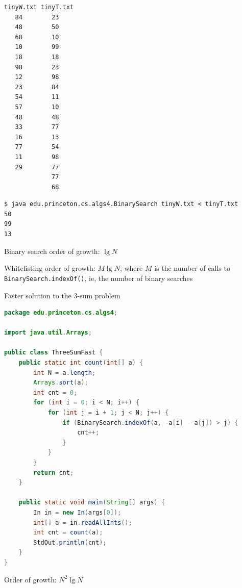 \documentclass[8pt,a4paper,compress]{beamer}
\begin{document}
\begin{frame}[fragile]
\pause

\begin{lstlisting}[language={}]
tinyW.txt tinyT.txt
   84        23
   48        50
   68        10
   10        99
   18        18
   98        23
   12        98
   23        84
   54        11
   57        10
   48        48
   33        77
   16        13
   77        54
   11        98
   29        77
             77
             68
\end{lstlisting}

\pause\bigskip

\begin{lstlisting}[language={}]
$ java edu.princeton.cs.algs4.BinarySearch tinyW.txt < tinyT.txt
50
99
13
\end{lstlisting}

\pause\bigskip

Binary search order of growth: $\lg N$ 

\pause\bigskip

Whitelisting order of growth: $M\lg N$, where $M$ is the number of calls to \lstinline{BinarySearch.indexOf()}, ie, the number of binary searches
\end{frame}

\begin{frame}[fragile]
\pause

Faster solution to the 3-sum problem

\smallskip

\begin{lstlisting}[language=Java,style=focusin]
package edu.princeton.cs.algs4;

import java.util.Arrays;

public class ThreeSumFast {
    public static int count(int[] a) {
        int N = a.length;
        Arrays.sort(a);
        int cnt = 0;
        for (int i = 0; i < N; i++) {
            for (int j = i + 1; j < N; j++) {
                if (BinarySearch.indexOf(a, -a[i] - a[j]) > j) {
                    cnt++;
                }
            }
        }
        return cnt;
    }
    
    public static void main(String[] args) {
        In in = new In(args[0]);
        int[] a = in.readAllInts();
        int cnt = count(a);
        StdOut.println(cnt);
    }
}
\end{lstlisting}

\pause\bigskip

Order of growth: $N^2\lg N$
\end{frame}
\end{document}
